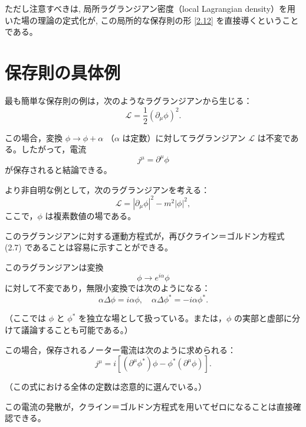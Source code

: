 \documentclass[a4paper,12pt]{article}
\begin{document}
\color{black}

ただし注意すべきは, 局所ラグランジアン密度（local Lagrangian density）を用いた場の理論の定式化が, この局所的な保存則の形 \eqref{2.12} を直接導くということである。

\bigskip

\section*{保存則の具体例}

最も簡単な保存則の例は，次のようなラグランジアンから生じる：
\begin{equation}
\mathcal{L} = \frac{1}{2} (\partial_\mu \phi)^2.
\end{equation}

この場合，変換 $\phi \to \phi + \alpha$ （$\alpha$ は定数）に対してラグランジアン $\mathcal{L}$ は不変である。したがって，電流
\[
j^\mu = \partial^\mu \phi
\]
が保存されると結論できる。

\bigskip

より非自明な例として，次のラグランジアンを考える：
\begin{equation}\label{2.14}
\mathcal{L} = |\partial_\mu \phi|^2 - m^2 |\phi|^2,
\tag{2.14}
\end{equation}
ここで，$\phi$ は複素数値の場である。

このラグランジアンに対する運動方程式が，再びクライン＝ゴルドン方程式 (2.7) であることは容易に示すことができる。

このラグランジアンは変換
\[
\phi \to e^{i\alpha} \phi
\]
に対して不変であり，無限小変換では次のようになる：
\begin{equation}\label{2.15}
\alpha \Delta \phi = i\alpha \phi, \quad \alpha \Delta \phi^* = -i\alpha \phi^*.
\tag{2.15}
\end{equation}

（ここでは $\phi$ と $\phi^*$ を独立な場として扱っている。または，$\phi$ の実部と虚部に分けて議論することも可能である。）

この場合，保存されるノーター電流は次のように求められる：
\begin{equation}\label{2.16}
j^\mu = i \left[ (\partial^\mu \phi^*) \phi - \phi^* (\partial^\mu \phi) \right].
\tag{2.16}
\end{equation}

（この式における全体の定数は恣意的に選んでいる。）

この電流の発散が，クライン＝ゴルドン方程式を用いてゼロになることは直接確認できる。
\end{document}
